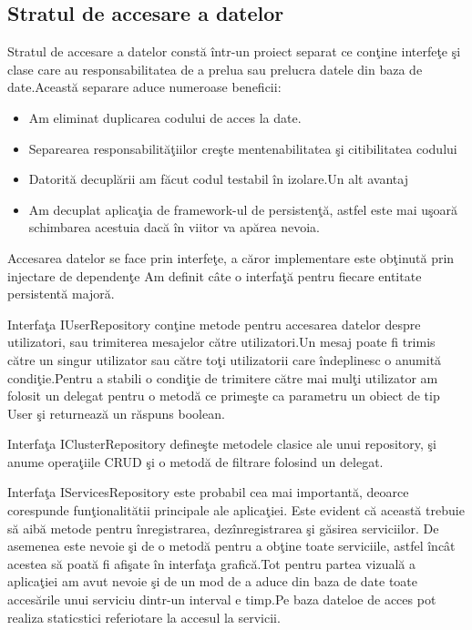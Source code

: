 \documentclass[a4paper,12pt]{report}
\begin{document}
\pagebreak

\subsection{Stratul de accesare a datelor}

Stratul de accesare a datelor const\u a \^intr-un proiect separat ce con\c tine interfe\c te \c si clase 
 care au responsabilitatea de a prelua sau prelucra datele din baza de date.Aceast\u a separare aduce numeroase
 beneficii:
 \begin{itemize}
	 \item Am eliminat duplicarea codului de acces la date.
	 \item Separearea responsabilit\u a\c tiilor cre\c ste mentenabilitatea \c si citibilitatea codului
	 \item Datorit\u a decupl\u arii am f\u acut codul testabil \^in izolare.Un alt avantaj
	 \item Am decuplat aplica\c tia de framework-ul de persisten\c t\u a, astfel este mai u\c soar\u a schimbarea
	 	acestuia dac\u a \^in viitor va ap\u area nevoia. 
 \end{itemize}
 
Accesarea datelor se face prin interfe\c te, a c\u aror implementare este ob\c tinut\u a prin injectare de dependen\c te
Am definit c\^ate o interfa\c t\u a pentru fiecare entitate persistent\u a major\u a.

Interfa\c ta IUserRepository con\c tine 
metode pentru accesarea datelor despre utilizatori, sau trimiterea mesajelor c\u atre utilizatori.Un mesaj poate fi trimis c\u atre 
un singur utilizator sau c\u atre to\c ti utilizatorii care \^indeplinesc o anumit\u a condi\c tie.Pentru a stabili o condi\c tie 
de trimitere c\u atre mai mul\c ti utilizator am folosit un delegat pentru o metod\u a ce prime\c ste ca parametru un obiect de tip 
User \c si returneaz\u a un r\u aspuns boolean.

Interfa\c ta IClusterRepository define\c ste metodele clasice ale unui repository, \c si anume opera\c tiile CRUD \c si o metod\u a de
filtrare folosind un delegat.

Interfa\c ta IServicesRepository este probabil cea mai important\u a, deoarce corespunde fun\c tionalit\u atii principale ale aplica\c tiei.
Este evident c\u a aceast\u a trebuie s\u a aib\u a metode pentru \^inregistrarea, dez\^inregistrarea \c si g\u asirea serviciilor.
De asemenea este nevoie \c si de o metod\u a pentru a ob\c tine toate serviciile, astfel \^inc\^at acestea s\u a poat\u a fi 
afi\c sate \^in interfa\c ta grafic\u a.Tot pentru partea vizual\u a a aplica\c tiei am avut nevoie \c si de un mod de a aduce 
din baza de date toate acces\u arile unui serviciu dintr-un interval e timp.Pe baza dateloe de acces pot realiza staticstici referiotare
la accesul la servicii.
\end{document}
